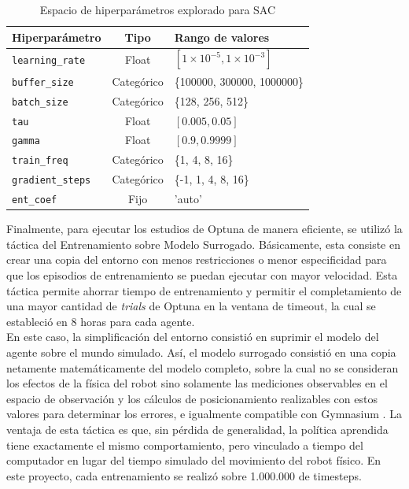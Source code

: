 \begin{table}[h!]
	\centering
	\caption{Espacio de hiperparámetros explorado para SAC}
	\begin{tabular}{|l|c|l|}
		\hline
		\textbf{Hiperparámetro} & \textbf{Tipo} & \textbf{Rango de valores} \\
		\hline
		\texttt{learning\_rate} & Float & $[1\times10^{-5}, 1\times10^{-3}]$ \\
		\texttt{buffer\_size} & Categórico & \{100000, 300000, 1000000\} \\
		\texttt{batch\_size} & Categórico & \{128, 256, 512\} \\
		\texttt{tau} & Float & $[0.005, 0.05]$ \\
		\texttt{gamma} & Float & $[0.9, 0.9999]$ \\
		\texttt{train\_freq} & Categórico & \{1, 4, 8, 16\} \\
		\texttt{gradient\_steps} & Categórico & \{-1, 1, 4, 8, 16\} \\
		\texttt{ent\_coef} & Fijo & 'auto' \\
		\hline
	\end{tabular}
	\label{tab:optuna-sac}
\end{table}

Finalmente, para ejecutar los estudios de Optuna de manera eficiente, se utilizó la táctica del Entrenamiento sobre Modelo Surrogado. Básicamente, esta consiste en crear una copia del entorno con menos restricciones o menor especificidad para que los episodios de entrenamiento se puedan ejecutar con mayor velocidad. Esta táctica permite ahorrar tiempo de entrenamiento y permitir el completamiento de una mayor cantidad de \textit{trials} de Optuna en la ventana de timeout, la cual se estableció en 8 horas para cada agente.\\

En este caso, la simplificación del entorno consistió en suprimir el modelo del agente sobre el mundo simulado. Así, el modelo surrogado consistió en una copia netamente matemáticamente del modelo completo, sobre la cual no se consideran los efectos de la física del robot sino solamente las mediciones observables en el espacio de observación y los cálculos de posicionamiento realizables con estos valores para determinar los errores, e igualmente compatible con Gymnasium \parencite{towers2024gymnasium}. La ventaja de esta táctica es que, sin pérdida de generalidad, la política aprendida tiene exactamente el mismo comportamiento, pero vinculado a tiempo del computador en lugar del tiempo simulado del movimiento del robot físico. En este proyecto, cada entrenamiento se realizó sobre 1.000.000 de timesteps. \\

